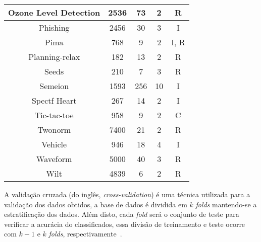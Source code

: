 \begin{table}[h]
\begin{tabular}{|c|c|c|c|c|}
            Ozone Level Detection           & 2536  &  73 &  2 & R \\ \hline
            Phishing                        & 2456  &  30 &  3 & I \\ \hline
            Pima                            &  768  &   9 &  2 & I, R \\ \hline
            Planning-relax                  &  182  &  13 &  2 & R \\ \hline
            Seeds                           &  210  &   7 &  3 & R \\ \hline
            Semeion                         & 1593  & 256 & 10 & I \\ \hline
            Spectf Heart                    &  267  &  14 &  2 & I \\ \hline
            Tic-tac-toe                     &  958  &   9 &  2 & C \\ \hline
            Twonorm                         & 7400  &  21 &  2 & R \\ \hline
            Vehicle                         &  946  &  18 &  4 & I \\ \hline
            Waveform                        & 5000  &  40 &  3 & R \\ \hline
            Wilt                            & 4839  &   6 &  2 & R \\ \hline
        \end{tabular}
        \label{tab:bases-de-dados}
    \end{table}
    
    
    
    A validação cruzada (do inglês, \textit{cross\hyp{validation}}) é uma técnica utilizada para a validação dos dados obtidos, a base de dados é dividida em $k$ \textit{folds} mantendo\hyp{se} a estratificação dos dados. Além disto, cada \textit{fold} será o conjunto de teste para verificar a acurácia do classificados, essa divisão de treinamento e teste ocorre com $k - 1$ e $k$ \textit{folds}, respectivamente~\cite{wong2015cross}.
    
